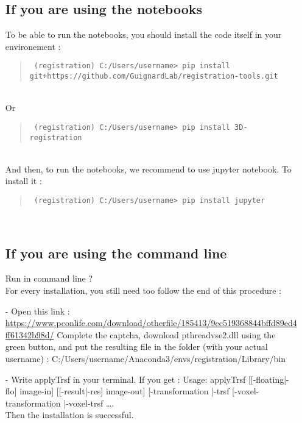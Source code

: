 \documentclass[10pt,a4paper]{book}
\newenvironment{code}[1]{\mbox{}\\[1ex]\hspace*{-#1cm}\begin{minipage}{150mm}\begin{quote}\tt}{\end{quote}\end{minipage}\mbox{}\\[1ex]}
\begin{document}
\begin{itemize}
\subsection{If you are using the notebooks}
To be able to run the notebooks, you should install the code itself in your environement :
\begin{code}{0.8}
\$ (registration) C:/Users/username> pip install git+https://github.com/GuignardLab/registration-tools.git
\end{code}
Or
\begin{code}{0.8}
\$ (registration) C:/Users/username> pip install 3D-registration
\end{code}
And then, to run the notebooks, we recommend to use jupyter notebook. To install it :
\begin{code}{0.8}
\$ (registration) C:/Users/username> pip install jupyter \\
\end{code}

\subsection{If you are using the command line}
Run in command line ? \\

For every installation, you still need too follow the end of this procedure :
\item[-]Open this link : \url{https://www.pconlife.com/download/otherfile/185413/9ec519368844bffd89ed4ff61342b98d/}
Complete the captcha, download pthreadvse2.dll using the green button, and put the resulting file in the folder (with your actual username) : C:/Users/username/Anaconda3/envs/registration/Library/bin \\

\item[-]Write applyTrsf in your terminal. If you get :
Usage: applyTrsf [[-floating|-flo] image-in] [[-result|-res] image-out]
 [-transformation |-trsf %
 [-voxel-transformation |-voxel-trsf %
…. \\
Then the installation is successful.


\end{itemize}
\end{document}
